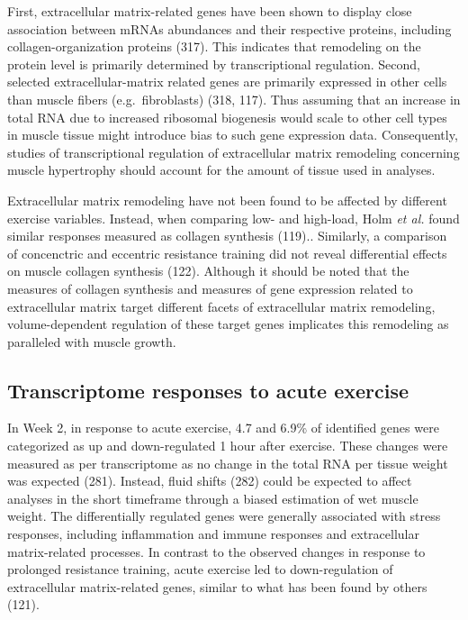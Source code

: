 \documentclass[twoside,10pt]{gihclass} %
\begin{document}
First, extracellular matrix-related genes have been shown to display close association between mRNAs abundances and their respective proteins, including collagen-organization proteins (317).
This indicates that remodeling on the protein level is primarily determined by transcriptional regulation.
Second, selected extracellular-matrix related genes are primarily expressed in other cells than muscle fibers (e.g.~fibroblasts)
(318, 117).
Thus assuming that an increase in total RNA due to increased ribosomal biogenesis would scale to other cell types in muscle tissue might introduce bias to such gene expression data.
Consequently, studies of transcriptional regulation of extracellular matrix remodeling concerning muscle hypertrophy should account for the amount of tissue used in analyses.

Extracellular matrix remodeling have not been found to be affected by different exercise variables. Instead, when comparing low- and high-load, Holm \emph{et al.} found similar responses measured as collagen synthesis (119)..
Similarly, a comparison of concenctric and eccentric resistance training did not reveal differential effects on muscle collagen synthesis
(122).
Although it should be noted that the measures of collagen synthesis and measures of gene expression related to extracellular matrix target different facets of extracellular matrix remodeling, volume-dependent regulation of these target genes implicates this remodeling as paralleled with muscle growth.

\hypertarget{transcriptome-responses-to-acute-exercise}{%
\subsection{Transcriptome responses to acute exercise}\label{transcriptome-responses-to-acute-exercise}}

In Week 2, in response to acute exercise, 4.7 and 6.9\% of identified genes were categorized as up and down-regulated 1 hour after exercise.
These changes were measured as per transcriptome as no change in the total RNA per tissue weight was expected
(281).
Instead, fluid shifts (282)
could be expected to affect analyses in the short timeframe through a biased estimation of wet muscle weight.
The differentially regulated genes were generally associated with stress responses, including inflammation and immune responses and extracellular matrix-related processes. In contrast to the observed changes in response to prolonged resistance training, acute exercise led to down-regulation of extracellular matrix-related genes, similar to what has been found by others (121).
\end{document}
